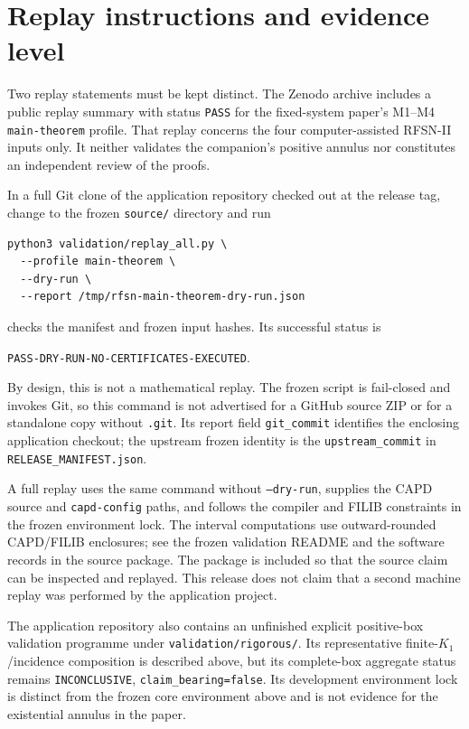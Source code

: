 \documentclass[11pt,reqno]{amsart}
\begin{document}
\section{Replay instructions and evidence level}

Two replay statements must be kept distinct.  The Zenodo archive includes a
public replay summary with status \texttt{PASS} for the fixed-system paper's
M1--M4 \texttt{main-theorem} profile.  That replay concerns the four
computer-assisted RFSN-II inputs only.  It neither validates the companion's
positive annulus nor constitutes an independent review of the proofs.

In a full Git clone of the application repository checked out at the release
tag, change to the frozen \texttt{source/} directory and run
\begin{verbatim}
python3 validation/replay_all.py \
  --profile main-theorem \
  --dry-run \
  --report /tmp/rfsn-main-theorem-dry-run.json
\end{verbatim}
checks the manifest and frozen input hashes.  Its successful status is
\begin{center}
\small\texttt{PASS-DRY-RUN-NO-CERTIFICATES-EXECUTED}.
\end{center}
By design, this is not a mathematical replay.
The frozen script is fail-closed and invokes Git, so this command is not
advertised for a GitHub source ZIP or for a standalone copy without
\texttt{.git}.  Its report field \texttt{git\_commit} identifies the
enclosing application checkout; the upstream frozen identity is the
\texttt{upstream\_commit} in \texttt{RELEASE\_MANIFEST.json}.

A full replay uses the same command without \texttt{--dry-run}, supplies the
CAPD source and \texttt{capd-config} paths, and follows the compiler and
FILIB constraints in the frozen environment lock.  The interval computations
use outward-rounded CAPD/FILIB enclosures; see the frozen validation README
and the software records in the source package.  The package is included so
that the source claim can be inspected and replayed.  This release does not
claim that a second machine replay was performed by the application project.

The application repository also contains an unfinished explicit positive-box
validation programme under \texttt{validation/rigorous/}.  Its representative
finite-$K_1$/incidence composition is described above, but its complete-box
aggregate status remains \texttt{INCONCLUSIVE},
\texttt{claim\_bearing=false}.  Its development environment lock is distinct
from the frozen core environment above and is not evidence for the
existential annulus in the paper.
\end{document}
